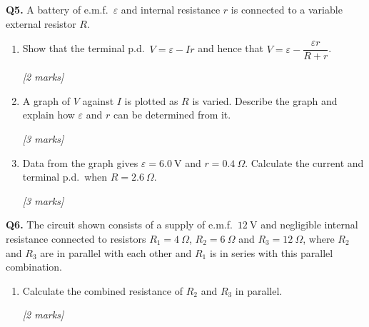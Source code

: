 \begin{tcolorbox}[colback=white, colframe=midblue, breakable]

\begin{minipage}{\linewidth}
\textbf{Q5.} A battery of e.m.f.\ $\varepsilon$ and internal resistance $r$ is connected to a variable external resistor $R$.
\end{minipage}

\begin{enumerate}[label=(\alph*)]
  \item \begin{minipage}[t]{\linewidth}
  Show that the terminal p.d.\ $V = \varepsilon - Ir$ and hence that $V = \varepsilon - \dfrac{\varepsilon r}{R+r}$.
  \par\hfill\textit{[2 marks]}
  \vspace{3cm}
  \end{minipage}

  \item \begin{minipage}[t]{\linewidth}
  A graph of $V$ against $I$ is plotted as $R$ is varied. Describe the graph and explain how $\varepsilon$ and $r$ can be determined from it.
  \par\hfill\textit{[3 marks]}
  \vspace{3.5cm}
  \end{minipage}

  \item \begin{minipage}[t]{\linewidth}
  Data from the graph gives $\varepsilon = 6.0\ \text{V}$ and $r = 0.4\ \Omega$. Calculate the current and terminal p.d.\ when $R = 2.6\ \Omega$.
  \par\hfill\textit{[3 marks]}
  \vspace{3cm}
  \end{minipage}
\end{enumerate}

\begin{minipage}{\linewidth}
\textbf{Q6.} The circuit shown consists of a supply of e.m.f.\ $12\ \text{V}$ and negligible internal resistance connected to resistors $R_1 = 4\ \Omega$, $R_2 = 6\ \Omega$ and $R_3 = 12\ \Omega$, where $R_2$ and $R_3$ are in parallel with each other and $R_1$ is in series with this parallel combination.

\begin{enumerate}[label=(\alph*)]
  \item Calculate the combined resistance of $R_2$ and $R_3$ in parallel.
  \par\hfill\textit{[2 marks]}
  \vspace{2.5cm}


\end{enumerate}
\end{minipage}
\end{tcolorbox}
